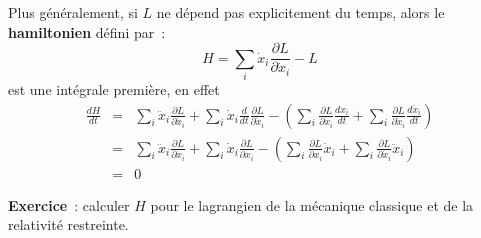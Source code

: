 \documentclass[a4paper,11pt]{article}
\begin{document}
Plus g\'en\'eralement, si $L$ ne d\'epend pas explicitement du temps,
alors le {\bf hamiltonien} d\'efini par~:
$$ H = \sum_i \dot{x}_i \frac{\partial L}{\partial \dot{x}_i} - L$$
est une int\'egrale premi\`ere, en effet
\begin{eqnarray*}
\frac{dH}{dt} &= &\sum_i \ddot{x}_i \frac{\partial L}{\partial
  \dot{x}_i} + \sum_i \dot{x}_i \frac{d}{dt}\frac{\partial
  L}{\partial \dot{x}_i}
- \left(\sum_i \frac{\partial L}{\partial x_i} \frac{dx_i}{dt}
+\sum_i \frac{\partial L}{\partial \dot{x}_i} \frac{d\dot{x}_i}{dt}
\right)\\
& =& 
\sum_i \ddot{x}_i \frac{\partial L}{\partial
  \dot{x}_i} + \sum_i \dot{x}_i \frac{\partial  L}{\partial x_i}
- \left(\sum_i \frac{\partial L}{\partial x_i} \dot{x}_i
+\sum_i \frac{\partial L}{\partial \dot{x}_i} \ddot{x}_i
\right) \\
&=&0
\end{eqnarray*}

{\bf Exercice}~: calculer $H$ pour le lagrangien de la m\'ecanique
classique et de la relativit\'e restreinte.
\end{document}
